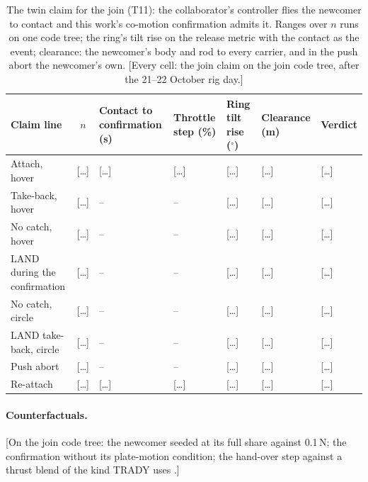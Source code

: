 
\begin{table}[htbp]
  \centering
  \footnotesize
  \caption[The twin claim for the join]{The twin claim for the join (T11): the collaborator's controller flies the
  newcomer to contact and this work's co-motion confirmation admits it. Ranges over $n$ runs on one code tree; the
  ring's tilt rise on the release metric with the contact as the event; clearance: the newcomer's body and rod to every
  carrier, and in the push abort the newcomer's own. [Every cell: the join claim on the join code tree, after the
  21--22 October rig day.]}
  \label{tab:T11}
  \begin{tabularx}{\textwidth}{XcYYYYl}
    \toprule
    Claim line & $n$ & Contact to confirmation (s) & Throttle step (\%) & Ring tilt rise ($^\circ$) & Clearance (m)
      & Verdict \\
    \midrule
    Attach, hover & [\dots] & [\dots] & [\dots] & [\dots] & [\dots] & [\dots] \\
    Take-back, hover & [\dots] & -- & -- & [\dots] & [\dots] & [\dots] \\
    No catch, hover & [\dots] & -- & -- & [\dots] & [\dots] & [\dots] \\
    LAND during the confirmation & [\dots] & -- & -- & [\dots] & [\dots] & [\dots] \\
    No catch, circle & [\dots] & -- & -- & [\dots] & [\dots] & [\dots] \\
    LAND take-back, circle & [\dots] & -- & -- & [\dots] & [\dots] & [\dots] \\
    Push abort & [\dots] & -- & -- & [\dots] & [\dots] & [\dots] \\
    Re-attach & [\dots] & [\dots] & [\dots] & [\dots] & [\dots] & [\dots] \\
    \bottomrule
  \end{tabularx}
\end{table}

\paragraph{Counterfactuals.} [On the join code tree: the newcomer seeded at its full share against 0.1\,N; the
confirmation without its plate-motion condition; the hand-over step against a thrust blend of the kind TRADY uses
\cite{sugihara2023trady}.]

